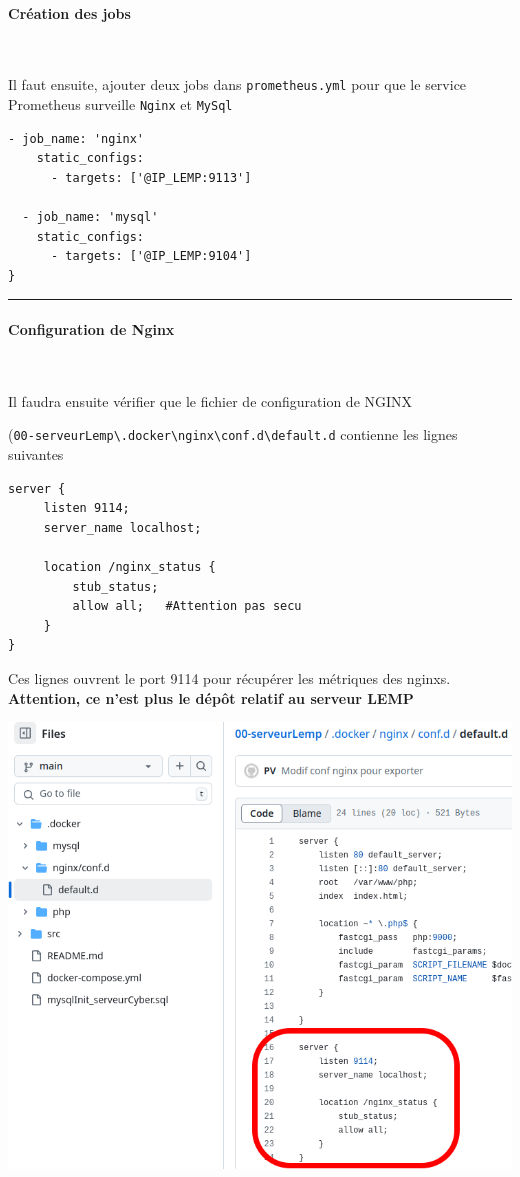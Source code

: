 \documentclass[french, 12pt]{article}%
\begin{document}
\paragraph{Création des jobs} \ 

Il faut ensuite, ajouter deux jobs dans \verb?prometheus.yml? pour que le service  Prometheus surveille \verb?Nginx? et \verb?MySql?
\begin{lstlisting}[style=commande] 
  - job_name: 'nginx'
    static_configs:
      - targets: ['@IP_LEMP:9113']

  - job_name: 'mysql'
    static_configs:
      - targets: ['@IP_LEMP:9104']    
}
\end{lstlisting} 

\begin{center}
 \rule{0.75\linewidth}{1pt}
 \end{center}



\paragraph{Configuration de Nginx}\ 

Il faudra ensuite vérifier que le fichier de configuration de NGINX

(\verb?00-serveurLemp\.docker\nginx\conf.d\default.d? contienne les lignes suivantes
\begin{lstlisting}[style=commande] 
server {
     listen 9114;
     server_name localhost;
 
     location /nginx_status {
         stub_status;
         allow all;   #Attention pas secu
     }
}
\end{lstlisting} 

Ces lignes ouvrent le port 9114 pour récupérer les métriques des nginxs. \textbf{Attention, ce n'est plus le dépôt relatif au serveur LEMP}

\begin{center}
\includegraphics[scale=0.4]{./ressource/verifNginx}
\end{center}
\end{document}
